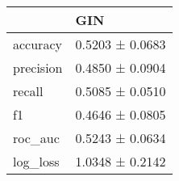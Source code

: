 \begin{tabular}{ll}
\toprule
 & GIN \\
\midrule
accuracy & 0.5203 ± 0.0683 \\
precision & 0.4850 ± 0.0904 \\
recall & 0.5085 ± 0.0510 \\
f1 & 0.4646 ± 0.0805 \\
roc_auc & 0.5243 ± 0.0634 \\
log_loss & 1.0348 ± 0.2142 \\
\bottomrule
\end{tabular}
